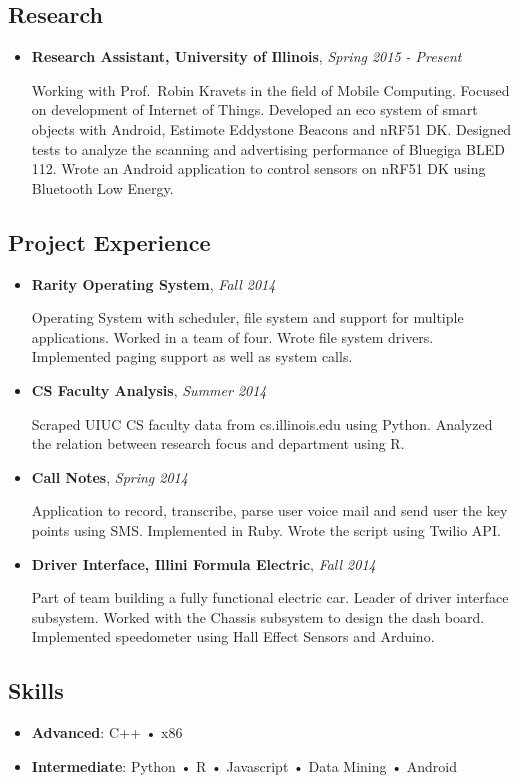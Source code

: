 \documentclass[]{article}
\begin{document}
\subsection{Research}

\begin{itemize}
\item
  \textbf{Research Assistant, University of Illinois}, \emph{Spring 2015
  - Present}

  Working with Prof.~Robin Kravets in the field of Mobile Computing.
  Focused on development of Internet of Things. Developed an eco system
  of smart objects with Android, Estimote Eddystone Beacons and nRF51
  DK. Designed tests to analyze the scanning and advertising performance
  of Bluegiga BLED 112. Wrote an Android application to control sensors
  on nRF51 DK using Bluetooth Low Energy.
\end{itemize}

\subsection{Project Experience}

\begin{itemize}
\item
  \textbf{Rarity Operating System}, \emph{Fall 2014}

  Operating System with scheduler, file system and support for multiple
  applications. Worked in a team of four. Wrote file system drivers.
  Implemented paging support as well as system calls.
\item
  \textbf{CS Faculty Analysis}, \emph{Summer 2014}

  Scraped UIUC CS faculty data from cs.illinois.edu using Python.
  Analyzed the relation between research focus and department using R.
\item
  \textbf{Call Notes}, \emph{Spring 2014}

  Application to record, transcribe, parse user voice mail and send user
  the key points using SMS. Implemented in Ruby. Wrote the script using
  Twilio API.
\item
  \textbf{Driver Interface, Illini Formula Electric}, \emph{Fall 2014}

  Part of team building a fully functional electric car. Leader of
  driver interface subsystem. Worked with the Chassis subsystem to
  design the dash board. Implemented speedometer using Hall Effect
  Sensors and Arduino.
\end{itemize}

\subsection{Skills}

\begin{itemize}
\item
  \textbf{Advanced}: C++ • x86
\item
  \textbf{Intermediate}: Python • R • Javascript • Data Mining • Android
\end{itemize}
\end{document}
